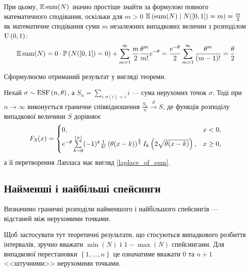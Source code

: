 При цьому, $\E\Sum(N)$ значно простіше знайти
за формулою повного математичного сподівання,
оскільки для $m > 0$ $\E\left(\Sum(N) \mid N([0, 1]) = m\right) = \frac{m}{2}$
як математичне сподівання суми $m$ незалежних випадкових величин
з розподілом $\Unif{0, 1}$:
\begin{gather*}
    \E\Sum(N) = 0\cdot \P{N([0, 1]) = 0} +
    \sum_{m=1}^{\infty} \frac{m}{2} \frac{\theta^m}{m!} e^{-\theta} =
    \frac{e^{-\theta}}{2}\sum_{m=1}^{\infty} \frac{\theta^m}{(m-1)!} = \frac{\theta}{2}
\end{gather*}

Сформулюємо отриманий результат у вигляді теореми.
\begin{theorem}
    Нехай $\sigma \sim \ESF{n, \theta}$, а 
    $S_n = \sum_{i : \sigma(i) = i} i$ --- сума нерухомих точок $\sigma$.
    Тоді при $n\to\infty$ виконується граничне
    співвідношення
    $\frac{S_n}{n} \overset{d}{\longrightarrow} S$,
    де функція розподілу випадкової величини $S$ дорівнює
    \begin{gather}
        F_{S}(x) = \begin{cases}
            0, & x < 0, \\
            e^{-\theta}
            \sum\limits_{k=0}^{\floor*{x}}
            (-1)^k \frac{1}{k!}\left(\theta(x-k)\right)^{\frac{k}{2}} I_k\left(2\sqrt{\theta(x-k)}\right), & x \geq 0,
        \end{cases}
    \end{gather}
    а її перетворення Лапласа має вигляд \eqref{laplace_of_sum}.
\end{theorem}

\subsection{Найменші і найбільші спейсинги}
Визначимо граничні розподіли найменшого і найбільшого спейсингів --- відстаней
між нерухомими точками.
\begin{remark}
    Щоб застосувати тут теоретичні результати, що стосуються
    випадкового розбиття інтервалів, зручно вважати
    $\min(N)$ і $1-\max(N)$ спейсингами. Для випадкової
    перестановки $\left\{1, \dots, n\right\}$ це означатиме
    вважати $0$ та $n+1$ <<штучними>> нерухомими точками.
\end{remark}

